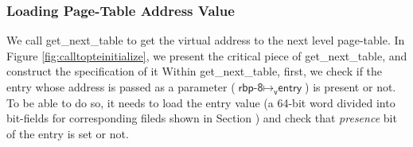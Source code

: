 \subsubsection{Loading Page-Table Address Value}
We call \textsf{get\_next\_table} to get the virtual address to the next level page-table. In Figure \ref{fig:calltopteinitialize}, we present the critical piece of \textsf{get\_next\_table}, and construct the specification of it 
Within \textsf{get\_next\_table}, first, we check if the entry whose address is passed as a parameter ($\textsf{rbp-8} \mapsto_{\textsf{v}} \textsf{entry}$) is present or not. To be able to do so, it needs to load the entry value (a 64-bit word divided into bit-fields for corresponding fileds shown in Section {}) and check that \textit{presence} bit of the entry is set or not.
%
